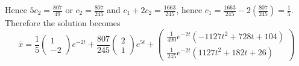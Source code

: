 \documentclass[11pt]{book}
\begin{document}
Hence $5c_{2}=\frac{807}{49}$ or $c_{2}=\frac{807}{245}$ and $c_{1}%
+2c_{2}=\frac{1663}{245}$, hence $c_{1}=\frac{1663}{245}-2\left(  \frac
{807}{245}\right)  =\frac{1}{5}$. Therefore the solution becomes%
\[
\bar{x}=\frac{1}{5}%
\begin{pmatrix}
1\\
-2
\end{pmatrix}
e^{-2t}+\frac{807}{245}%
\begin{pmatrix}
2\\
1
\end{pmatrix}
e^{5t}+%
\begin{pmatrix}
\frac{1}{490}e^{-2t}\left(  -1127t^{2}+728t+104\right)  \\
\frac{1}{245}e^{-2t}\left(  1127t^{2}+182t+26\right)
\end{pmatrix}
\]
\end{document}
